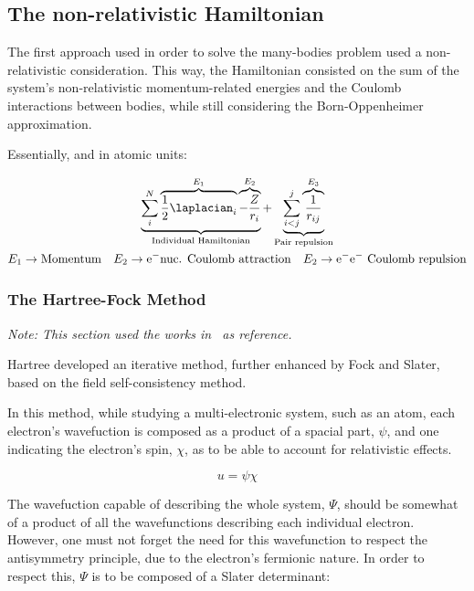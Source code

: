 \subsection{The non-relativistic Hamiltonian}

The first approach used in order to solve the many-bodies problem used a non-relativistic consideration. This way, the Hamiltonian consisted on the sum of the system's non-relativistic momentum-related energies and the Coulomb interactions between bodies, while still considering the Born-Oppenheimer approximation.

Essentially, and in atomic units:




\begin{equation}
    \begin{gathered}
        \underbrace{\sum_i^N \overbrace{ \dfrac{1}{2}\laplacian_i}^{E_1}  \overbrace{-\frac{Z}{r_i}}^{E_2}}_{\text{Individual Hamiltonian}}  + \underbrace{\sum_{i<j}^{j}\overbrace{\dfrac{1}{r_{ij}}}^{E_3}}_{\text{Pair repulsion}}\\
        E_1\rightarrow\text{Momentum}\quad E_2\rightarrow\text{e$^-$nuc. Coulomb attraction}\quad E_2\rightarrow\text{e$^-$e$^-$ Coulomb repulsion}
    \end{gathered}
    \label{eq:nonRelHam}
\end{equation}



\subsubsection{The Hartree-Fock Method}\label{sec:HF}
\textit{Note: This section used the works in~\cite{HFweb,JPS,Ramon,Blinder2018} as reference.}

Hartree developed an iterative method, further enhanced by Fock and Slater, based on the field self-consistency method.

In this method, while studying a multi-electronic system, such as an atom, each electron's wavefuction is composed as a product of a spacial part, $\psi$, and one indicating the electron's spin, $\chi$, as to be able to account for relativistic effects.

\begin{equation}
    u=\psi\chi
\end{equation}

The wavefuction capable of describing the whole system, $\Psi$, should be somewhat of a product of all the wavefunctions describing each individual electron. However, one must not forget the need for this wavefunction to respect the antisymmetry principle, due to the electron's fermionic nature. In order to respect this, $\Psi$ is to be composed of a Slater determinant:


